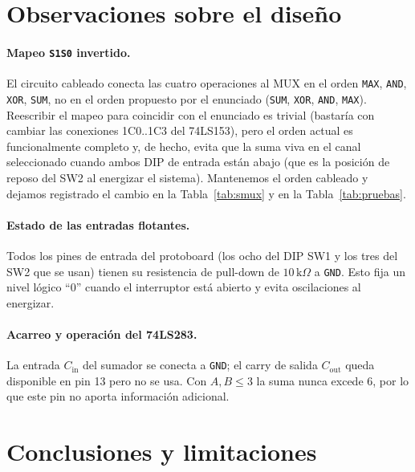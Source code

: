 \documentclass[a4paper,12pt]{article}
\begin{document}
\section{Observaciones sobre el dise\~{n}o}
\label{sec:observaciones}

\paragraph{Mapeo \texttt{S1S0} invertido.} El circuito cableado conecta
las cuatro operaciones al MUX en el orden \texttt{MAX}, \texttt{AND},
\texttt{XOR}, \texttt{SUM}, no en el orden propuesto por el enunciado
(\texttt{SUM}, \texttt{XOR}, \texttt{AND}, \texttt{MAX}). Reescribir el
mapeo para coincidir con el enunciado es trivial (bastar\'{i}a con
cambiar las conexiones 1C0..1C3 del 74LS153), pero el orden actual es
funcionalmente completo y, de hecho, evita que la suma viva en el canal
seleccionado cuando ambos DIP de entrada est\'{a}n abajo (que es la
posici\'{o}n de reposo del SW2 al energizar el sistema). Mantenemos
el orden cableado y dejamos registrado el cambio en la
Tabla~\ref{tab:smux} y en la Tabla~\ref{tab:pruebas}.

\paragraph{Estado de las entradas flotantes.} Todos los pines de entrada
del protoboard (los ocho del DIP SW1 y los tres del SW2 que se usan)
tienen su resistencia de pull-down de $10\,\mathrm{k}\Omega$ a
\texttt{GND}. Esto fija un nivel l\'{o}gico ``0'' cuando el interruptor
est\'{a} abierto y evita oscilaciones al energizar.

\paragraph{Acarreo y operaci\'{o}n del 74LS283.} La entrada
$C_\text{in}$ del sumador se conecta a \texttt{GND}; el carry de salida
$C_\text{out}$ queda disponible en pin 13 pero no se usa. Con $A, B
\le 3$ la suma nunca excede $6$, por lo que este pin no aporta
informaci\'{o}n adicional.

\section{Conclusiones y limitaciones}
\label{sec:limitaciones}
\end{document}
